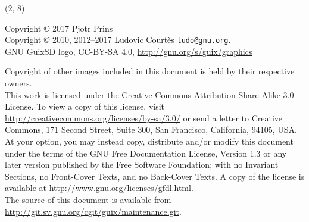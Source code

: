 \documentclass{beamer}
\begin{document}
\begin{frame}{}

  \begin{textblock}{12}(2, 8)
    \tiny{
      Copyright \copyright{} 2017 Pjotr Prins\\
      Copyright \copyright{} 2010, 2012--2017 Ludovic Courtès \texttt{ludo@gnu.org}.\\[3.0mm]
      GNU GuixSD logo, CC-BY-SA 4.0, \url{http://gnu.org/s/guix/graphics}

      Copyright of other images included in this document is held by
      their respective owners.
      \\[3.0mm]
      This work is licensed under the \alert{Creative Commons
        Attribution-Share Alike 3.0} License.  To view a copy of this
      license, visit
      \url{http://creativecommons.org/licenses/by-sa/3.0/} or send a
      letter to Creative Commons, 171 Second Street, Suite 300, San
      Francisco, California, 94105, USA.
      \\[2.0mm]
      At your option, you may instead copy, distribute and/or modify
      this document under the terms of the \alert{GNU Free Documentation
        License, Version 1.3 or any later version} published by the Free
      Software Foundation; with no Invariant Sections, no Front-Cover
      Texts, and no Back-Cover Texts.  A copy of the license is
      available at \url{http://www.gnu.org/licenses/gfdl.html}.
      \\[2.0mm]
      The source of this document is available from
      \url{http://git.sv.gnu.org/cgit/guix/maintenance.git}.
    }
  \end{textblock}
\end{frame}
\end{document}
